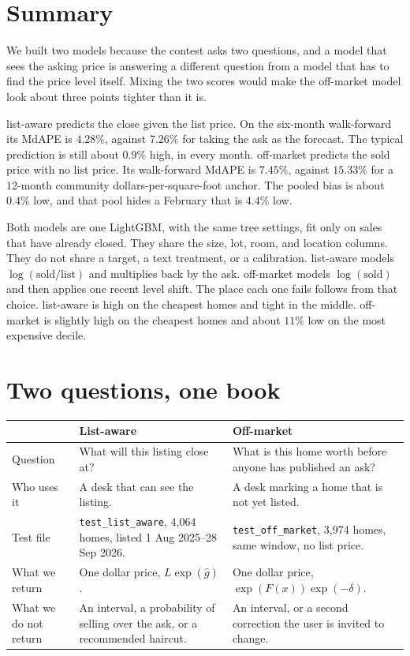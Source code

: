 \documentclass[11pt]{article}
\newcommand{\la}{list-aware}
\newcommand{\om}{off-market}
\begin{document}
\tableofcontents
\newpage

\section{Summary}
\label{sec:summary}

We built two models because the contest asks two questions, and a model that sees the asking price is answering a different question from a model that has to find the price level itself. Mixing the two scores would make the off-market model look about three points tighter than it is.

\la{} predicts the close given the list price. On the six-month walk-forward its MdAPE is \(4.28\%\), against \(7.26\%\) for taking the ask as the forecast. The typical prediction is still about \(0.9\%\) high, in every month. \om{} predicts the sold price with no list price. Its walk-forward MdAPE is \(7.45\%\), against \(15.33\%\) for a 12-month community dollars-per-square-foot anchor. The pooled bias is about \(0.4\%\) low, and that pool hides a February that is \(4.4\%\) low.

Both models are one LightGBM, with the same tree settings, fit only on sales that have already closed. They share the size, lot, room, and location columns. They do not share a target, a text treatment, or a calibration. \la{} models \(\log(\text{sold}/\text{list})\) and multiplies back by the ask. \om{} models \(\log(\text{sold})\) and then applies one recent level shift. The place each one fails follows from that choice. \la{} is high on the cheapest homes and tight in the middle. \om{} is slightly high on the cheapest homes and about \(11\%\) low on the most expensive decile.

\section{Two questions, one book}
\label{sec:questions}

\begin{center}
\small
\begin{tabular}{p{3.2cm}p{5.6cm}p{5.6cm}}
\toprule
 & List-aware & Off-market \\
\midrule
Question & What will this listing close at? & What is this home worth before anyone has published an ask? \\
Who uses it & A desk that can see the listing. & A desk marking a home that is not yet listed. \\
Test file & \texttt{test\_list\_aware}, 4{,}064 homes, listed 1 Aug 2025--28 Sep 2026. & \texttt{test\_off\_market}, 3{,}974 homes, same window, no list price. \\
What we return & One dollar price, \(L\exp(\hat g)\). & One dollar price, \(\exp(F(x))\exp(-\delta)\). \\
What we do not return & An interval, a probability of selling over the ask, or a recommended haircut. & An interval, or a second correction the user is invited to change. \\
\bottomrule
\end{tabular}
\end{center}
\end{document}
